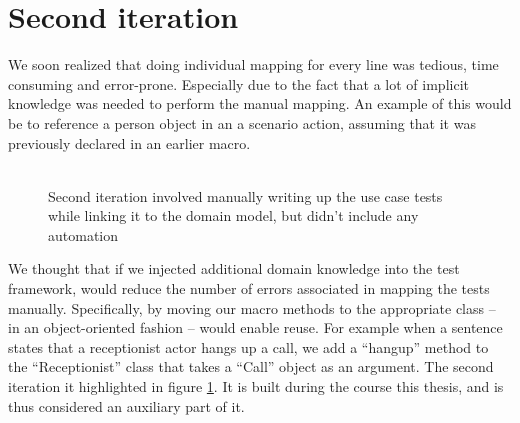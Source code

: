 \section{Second iteration}
We soon realized that doing individual mapping for every line was tedious, time consuming and error-prone. Especially due to the fact that a lot of implicit knowledge was needed to perform the manual mapping. An example of this would be to reference a person object in an a scenario action, assuming that it was previously declared in an earlier macro.\\\\
\begin{figure}[!htbp]
\centering
{}
\label{fig:project_parameter_plot_2nd_iteration}
\caption{Second iteration involved manually writing up the use case tests while linking it to the domain model, but didn't include any automation}
\end{figure}We thought that if we injected additional domain knowledge into the test framework, would reduce the number of errors associated in mapping the tests manually. Specifically, by moving our macro methods to the appropriate class -- in an object-oriented fashion -- would enable reuse. For example when a sentence states that a receptionist actor hangs up a call, we add a ``hangup'' method to the  ``Receptionist'' class that takes a ``Call'' object as an argument. The second iteration it highlighted in figure \ref{fig:project_parameter_plot_2nd_iteration}. It is built during the course this thesis, and is thus considered an auxiliary part of it.

